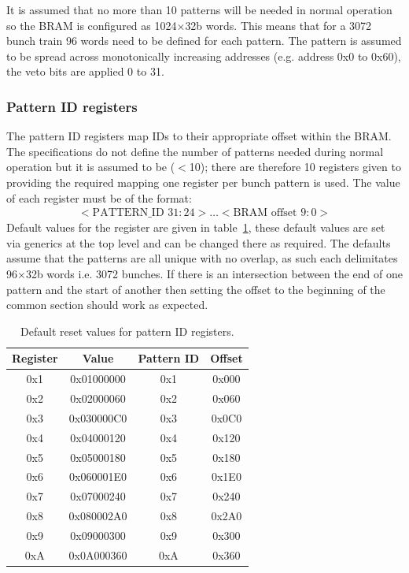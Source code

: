 It is assumed that no more than 10 patterns will be needed in normal operation so the BRAM is configured as 1024\( \times  \)32b words. This means that for a 3072 bunch train 96 words need to be defined for each pattern. The pattern is assumed to be spread across monotonically increasing addresses (e.g. address 0x0 to 0x60), the veto bits are applied 0 to 31. 
\subsubsection{Pattern ID registers} %
\label{sub:pattern_id_registers}
The pattern ID registers map IDs to their appropriate offset within the BRAM. The specifications do not define the number of patterns needed during normal operation but it is assumed to be (\( < \)10); there are therefore 10 registers given to providing the required mapping one register per bunch pattern is used. The value of each register must be of the format:
\begin{align} \label{fmt:pattern_id}
  <\text{PATTERN\_ID } 31:24>\ldots<\text{BRAM offset } 9:0> 
\end{align}
Default values for the register are given in table~\ref{tab:default_pattern_id_reg}, these default values are set via generics at the top level and can be changed there as required. The defaults assume that the patterns are all unique with no overlap, as such each delimitates 96\( \times \)32b words i.e. 3072 bunches. If there is an intersection between the end of one pattern and the start of another then setting the offset to the beginning of the common section should work as expected.
\begin{table}
  \begin{center}
    \begin{tabular}{c|c|c|c}
      Register & Value      & Pattern ID & Offset \\
      \hline
      0x1      & 0x01000000 & 0x1        & 0x000  \\ 
      0x2      & 0x02000060 & 0x2        & 0x060  \\  
      0x3      & 0x030000C0 & 0x3        & 0x0C0  \\ 
      0x4      & 0x04000120 & 0x4        & 0x120  \\ 
      0x5      & 0x05000180 & 0x5        & 0x180  \\ 
      0x6      & 0x060001E0 & 0x6        & 0x1E0  \\ 
      0x7      & 0x07000240 & 0x7        & 0x240  \\ 
      0x8      & 0x080002A0 & 0x8        & 0x2A0  \\ 
      0x9      & 0x09000300 & 0x9        & 0x300  \\ 
      0xA      & 0x0A000360 & 0xA        & 0x360  \\ 
    \end{tabular}
  \end{center}
  \caption{Default reset values for pattern ID registers.}
  \label{tab:default_pattern_id_reg}
\end{table}

